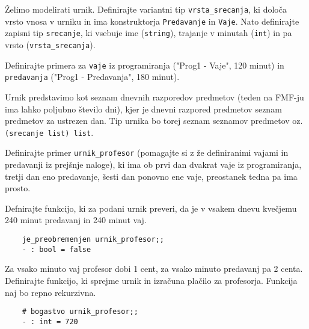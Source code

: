 \documentclass[arhiv]{../izpit}
\begin{document}
	
	\naloga
	
	\podnaloga 
	Želimo modelirati urnik. 
	Definirajte variantni tip \verb|vrsta_srecanja|, ki določa vrsto vnosa v urniku in ima konstruktorja \verb|Predavanje| in \verb|Vaje|.
	Nato definirajte zapisni tip \verb|srecanje|, ki vsebuje ime (\verb|string|), trajanje v minutah (\verb|int|) in pa vrsto (\verb|vrsta_srecanja|).
	
	
	\podnaloga Definirajte primera za \verb|vaje| iz programiranja ("Prog1 - Vaje", 120 minut) in \verb|predavanja| ("Prog1 - Predavanja", 180 minut).
	
	\podnaloga Urnik predstavimo kot seznam dnevnih razporedov predmetov (teden na FMF-ju ima lahko poljubno število dni), kjer je dnevni razpored predmetov seznam predmetov za ustrezen dan. Tip urnika bo torej seznam seznamov predmetov oz. \verb| (srecanje list) list|. 
	
	Definirajte primer \verb|urnik_profesor| (pomagajte si z že definiranimi vajami in predavanji iz prejšnje naloge), ki ima ob prvi dan dvakrat vaje iz programiranja, tretji dan eno predavanje, šesti dan ponovno ene vaje, preostanek tedna pa ima prosto.
	
	\podnaloga Defnirajte funkcijo, ki za podani urnik preveri, da je v vsakem dnevu kvečjemu 240 minut predavanj in 240 minut vaj.
	
	\begin{verbatim}
	je_preobremenjen urnik_profesor;;
	- : bool = false
	\end{verbatim}
	
	\podnaloga Za vsako minuto vaj profesor dobi 1 cent, za vsako minuto predavanj pa 2 centa. Definirajte funkcijo, ki sprejme urnik in izračuna plačilo za profesorja. Funkcija naj bo repno rekurzivna.
	
	\begin{verbatim}
	# bogastvo urnik_profesor;;
	- : int = 720
	\end{verbatim}
	
	
\end{document}
